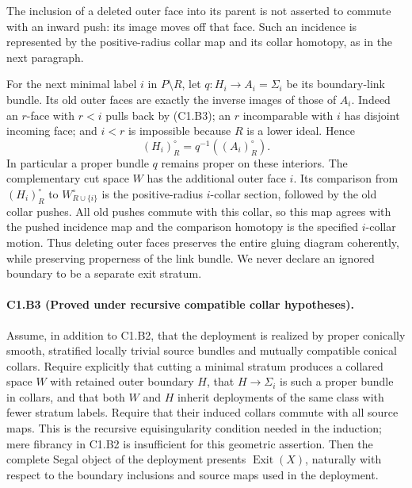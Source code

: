 The inclusion of a deleted outer face into its parent is not asserted
to commute with an inward push: its image moves off that face.
Such an incidence is represented by the positive-radius collar map
and its collar homotopy, as in the next paragraph.

For the next minimal label $i$ in $P\setminus R$, let
$q:H_i\to A_i=\Sigma_i$ be its boundary-link bundle. Its old outer
faces are exactly the inverse images of those of $A_i$. Indeed an
$r$-face with $r<i$ pulls back by (C1.B3); an $r$ incomparable with
$i$ has disjoint incoming face; and $i<r$ is impossible because
$R$ is a lower ideal. Hence
\[
 (H_i)^\circ_R=q^{-1}((A_i)^\circ_R).
 \tag{C1.B4a}
\]
In particular a proper bundle $q$ remains proper on these interiors.
The complementary cut space $W$ has the additional outer face $i$.
Its comparison from $(H_i)^\circ_R$ to $W^\circ_{R\cup\{i\}}$
is the positive-radius $i$-collar section, followed by the old
collar pushes. All old pushes commute with this collar, so this
map agrees with the pushed incidence map and the comparison
homotopy is the specified $i$-collar motion. Thus deleting outer
faces preserves the entire gluing diagram coherently, while
preserving properness of the link bundle. We never declare an
ignored boundary to be a separate exit stratum.

\paragraph{C1.B3 (Proved under recursive compatible collar hypotheses).}
Assume, in addition to C1.B2, that the deployment is realized by
proper conically smooth, stratified locally trivial source bundles
and mutually compatible conical collars. Require explicitly that
cutting a minimal stratum produces a collared space $W$
with retained outer boundary $H$, that $H\to\Sigma_i$ is such a
proper bundle in collars, and that both $W$ and $H$ inherit deployments of the
same class with fewer stratum labels. Require that their induced
collars commute with all source maps. This is the recursive
equisingularity condition needed in the induction; mere fibrancy
in C1.B2 is insufficient for this geometric assertion.
Then the complete Segal object of the deployment presents
$\operatorname{Exit}(X)$, naturally with respect to the boundary
inclusions and source maps used in the deployment.

